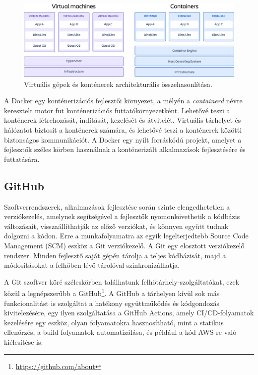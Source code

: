 \begin{figure}[ht]
	\centering
	\includegraphics[width=120mm, keepaspectratio]{figures/virtudocker.png}
	\caption{Virtuális gépek és konténerek architekturális összehasonlítása.}
	\label{fig:virtudocker}
\end{figure}

A Docker egy konténerizációs fejlesztői környezet, a mélyén a \emph{containerd} névre keresztelt motor fut konténerizációs futtatókörnyezetként. \cite{Docker} Lehetővé teszi a konténerek létrehozását, indítását, kezelését és átvitelét. Virtuális tárhelyet és hálózatot biztosít a konténerek számára, és lehetővé teszi a konténerek közötti biztonságos kommunikációt. A Docker egy nyílt forráskódú projekt, amelyet a fejlesztők széles körben használnak a konténerizált alkalmazások fejlesztésére és futtatására.

\subsection{GitHub}

Szoftverrendszerek, alkalmazások fejlesztése során szinte elengedhetetlen a verziókezelés, amelynek segítségével a fejlesztők nyomonkövethetik a kódbázis változásait, visszaállíthatják az előző verziókat, és könnyen együtt tudnak dolgozni a kódon. Erre a munkafolyamatra az egyik legelterjedtebb Source Code Management (SCM) eszköz a Git verziókezelő. A Git egy elosztott verziókezelő rendszer. Minden fejlesztő saját gépén tárolja a teljes kódbázisát, majd a módosításokat a felhőben lévő tárolóval szinkronizálhatja.

A Git szoftver köré széleskörben találhatunk felhőtárhely-szolgáltatókat, ezek közül a legnépszerűbb a GitHub\footnote{\url{https://github.com/about}}. A GitHub a tárhelyen kívül sok más funkcionalitást is szolgáltat a hatékony együttműködés és kódgondozás kivitelezésére, egy ilyen szolgáltatása a GitHub Actions, amely CI/CD-folyamatok kezelésére egy eszköz, olyan folyamatokra hasznosítható, mint a statikus ellenőrzés, a build folyamatok automatizálása, és például a kód AWS-re való kiélesítése is.

